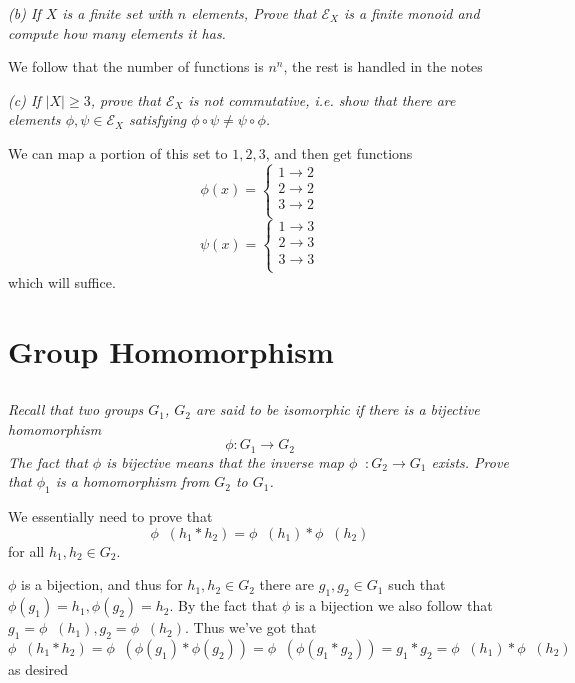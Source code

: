 \documentclass[11pt,oneside,titlepage]{book}
\DeclareMathOperator \inv {^{-1}}
\begin{document}
\textit{(b) If $X$ is a finite set with $n$ elements, Prove that
  $\mathcal{E}_X$ is a finite monoid and compute how many elements it has.}

We follow that the number of functions is $n^n$, the rest is handled in the notes

\textit{(c) If $|X| \geq 3$, prove that $\mathcal{E}_X$ is not commutative, i.e.
  show that there are elements $\phi, \psi \in \mathcal{E}_X$ satisfying
  $\phi \circ \psi \neq \psi \circ \phi$.}

We can map a portion of this set to ${1, 2, 3}$, and then get functions
$$\phi(x) =
\begin{cases}
  1 \to 2 \\
  2 \to 2 \\
  3 \to 2 \\ 
\end{cases}
$$
$$\psi(x) =
\begin{cases}
  1 \to 3 \\
  2 \to 3 \\
  3 \to 3 \\ 
\end{cases}
$$
which will suffice.

\section{Group Homomorphism}

\subsection{}

\textit{Recall that two groups $G_1$, $G_2$ are said to be isomorphic
  if there is a bijective homomorphism
  $$\phi: G_1 \to G_2$$
  The fact that $\phi$ is bijective means that the inverse map $\phi \inv : G_2 \to G_1$ exists.
  Prove that $\phi_1$ is a homomorphism from $G_2$ to $G_1$. 
}

We essentially need to prove that
$$\phi\inv(h_1 * h_2) = \phi \inv (h_1) * \phi \inv (h_2)$$
for all $h_1, h_2 \in G_2$.

$\phi$ is a bijection, and thus for $h_1, h_2 \in G_2$ there are $g_1, g_2 \in G_1$ such that
$\phi(g_1) = h_1, \phi(g_2) = h_2$. By the fact that $\phi$ is a bijection we also follow that
$g_1 = \phi\inv(h_1), g_2 = \phi\inv(h_2)$. Thus we've got that 
$$\phi\inv(h_1 * h_2) = \phi\inv(\phi(g_1) * \phi(g_2)) =
\phi\inv(\phi(g_1 * g_2)) = g_1 * g_2  = \phi\inv(h_1) * \phi\inv(h_2) $$
as desired
\end{document}
